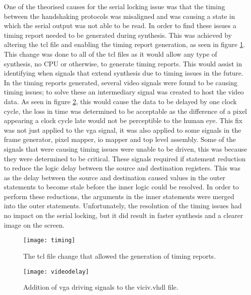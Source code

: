 One of the theorised causes for the serial locking issue was that the timing between the handshaking protocols was misaligned and was causing a state in which the serial output was not able to be read. In order to find these issues a timing report needed to be generated during synthesis. This was achieved by altering the tcl file and enabling the timing report generation, as seen in figure \ref{fig:timing}. This change was done to all of the tcl files as it would allow any type of synthesis, no CPU or otherwise, to generate timing reports. This would assist in identifying when signals that extend synthesis due to timing issues in the future. In the timing reports generated, several video signals were found to be causing timing issues; to solve these an intermediary signal was created to host the video data. As seen in figure \ref{fig:videodelay}, this would cause the data to be delayed by one clock cycle, the loss in time was determined to be acceptable as the difference of a pixel appearing a clock cycle late would not be perceptible to the human eye. This fix was not just applied to the vga signal, it was also applied to some signals in the frame generator, pixel mapper, io mapper and top level assembly. Some of the signals that were causing timing issues were unable to be driven, this was because they were determined to be critical. These signals required if statement reduction to reduce the logic delay between the source and destination registers. This was as the delay between the source and destination caused values in the outer statements to become stale before the inner logic could be resolved. In order to perform these reductions, the arguments in the inner statements were merged into the outer statements. Unfortunately, the resolution of the timing issues had no impact on the serial locking, but it did result in faster synthesis and a clearer image on the screen.

\begin{figure}
  \centering
  \texttt{[image: timing]}
  \caption{The tcl file change that allowed the generation of timing reports.}
  \label{fig:timing}
\end{figure}

\begin{figure}
  \centering
  \texttt{[image: videodelay]}
  \caption{Addition of vga driving signals to the viciv.vhdl file.}
  \label{fig:videodelay}
\end{figure}

